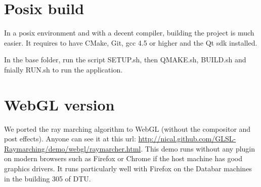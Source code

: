 \section{Posix build}

In a posix environment and with a decent compiler, building the project is much
easier. It requires to have CMake, Git, gcc 4.5 or higher and the Qt sdk installed.

In the base folder, run the script SETUP.sh, then QMAKE.sh, BUILD.sh and fnially
RUN.sh to run the application.

\section{WebGL version}

We ported the ray marching algorithm to WebGL (without the compositor and post effects).
Anyone can see it at this url: \url{http://nical.github.com/GLSL-Raymarching/demo/webgl/raymarcher.html}.
This demo runs without any plugin on modern browsers such as Firefox or Chrome
if the host machine has good graphics drivers. It runs particularly well with Firefox
on the Databar machines in the building 305 of DTU.

